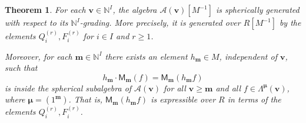 \documentclass[11pt,reqno]{amsart}
\renewcommand{\mathbf}{\mathbold}
\numberwithin{equation}{section}
\newtheorem{Theorem}[equation]{Theorem}
\theoremstyle{definition}
\newcommand{\cA}{\mathcal{A}}
\newcommand{\bm}{\mathbf{m}}
\newcommand{\bv}{\mathbf{v}}
\newcommand{\NN}{\mathbb{N}}
\renewcommand{\bv}{\mathbf{v}} %
\newcommand{\M}{\mathsf{M}}
\newcommand{\vertexset}{I}
\newcommand{\GT}{\Lambda}
\newcommand{\base}{R}
\newcommand{\bmu}{{\boldsymbol{\mu}}}
\newcommand{\qzast}{\cA}
\begin{document}
\begin{Theorem}
    \label{thm:sphericalgenv}
    For each $\bv \in \NN^\vertexset$, the algebra $\qzast(\bv)[M^{-1}]$ is spherically generated with respect to its $\NN^\vertexset$-grading.  More precisely, it is generated over $\base[M^{-1}]$ by the elements $Q_i^{(r)}, F_i^{(r)}$ for $i\in \vertexset$ and $r\geq 1$.
    \smallskip
    
    Moreover, for each $\bm \in \NN^\vertexset$ there exists an element $h_\bm \in M$, independent of $\bv$, such that 
    $$
    h_\bm \cdot \M_\bm(f)  = \M_\bm(h_\bm f)
    $$
    is inside the spherical subalgebra of $\qzast(\bv)$ for all $\bv \geq \bm$ and all $f \in \GT^\bmu(\bv)$, where $\bmu = (1^\bm)$. That is, $\M_\bm(h_\bm f)$ is expressible over $\base$ in terms of the elements $Q_i^{(r)}, F_i^{(r)}$.
\end{Theorem}
\end{document}
